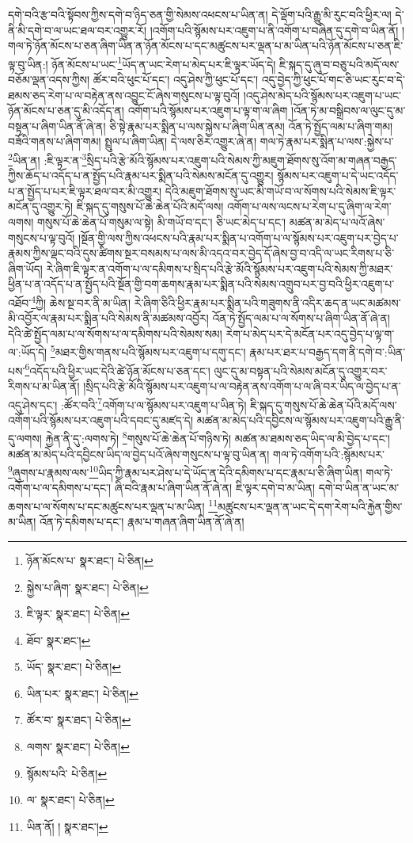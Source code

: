 དགེ་བའི་རྩ་བའི་སྟོབས་ཀྱིས་དགེ་བ་ཉིད་ཅན་གྱི་སེམས་འཕངས་པ་ཡིན་ན། དེ་ལྡོག་པའི་རྒྱུ་མི་རུང་བའི་ཕྱིར་ལ། དེ་ནི་མི་དགེ་བ་ལ་ཡང་ཐལ་བར་འགྱུར་རོ། །འགོག་པའི་སྙོམས་པར་འཇུག་པ་ནི་འགོག་པ་བཞིན་དུ་དགེ་བ་ཡིན་ནོ། །གལ་ཏེ་ཉོན་མོངས་པ་ཅན་ཞིག་ཡིན་ན་ཉོན་མོངས་པ་དང་མཚུངས་པར་ལྡན་པ་མ་ཡིན་པའི་ཉོན་མོངས་པ་ཅན་ཇི་ལྟ་བུ་ཡིན:། ཉོན་མོངས་པ་ཡང་\footnote{ཉོན་མོངས་པ་  སྣར་ཐང་།  པེ་ཅིན། }ཡོད་ན་ཡང་རེག་པ་མེད་པར་ཇི་ལྟར་ཡོད་དེ། ཇི་སྐད་དུ་ཞུ་བ་བཅུ་པའི་མདོ་ལས་བཅོམ་ལྡན་འདས་ཀྱིས། ཚོར་བའི་ཕུང་པོ་དང་། འདུ་ཤེས་ཀྱི་ཕུང་པོ་དང་། འདུ་བྱེད་ཀྱི་ཕུང་པོ་གང་ཅི་ཡང་རུང་བ་དེ་ཐམས་ཅད་རེག་པ་ལ་བརྟེན་ནས་འབྱུང་ངོ་ཞེས་གསུངས་པ་ལྟ་བུའོ། །འདུ་ཤེས་མེད་པའི་སྙོམས་པར་འཇུག་པ་ཡང་ཉོན་མོངས་པ་ཅན་དུ་མི་འདོད་ན། འགོག་པའི་སྙོམས་པར་འཇུག་པ་ལྟ་ག་ལ་ཞིག །འོན་ཏེ་མ་བསྒྲིབས་ལ་ལུང་དུ་མ་བསྟན་པ་ཞིག་ཡིན་ནོ་ཞེ་ན། ཅི་སྟེ་རྣམ་པར་སྨིན་པ་ལས་སྐྱེས་པ་ཞིག་ཡིན་ནམ། འོན་ཏེ་སྤྱོད་ལམ་པ་ཞིག་གམ། བཟོའི་གནས་པ་ཞིག་གམ། སྤྲུལ་པ་ཞིག་ཡིན། དེ་ལས་ཅིར་འགྱུར་ཞེ་ན། གལ་ཏེ་རྣམ་པར་སྨིན་པ་ལས་:སྐྱེས་པ་\footnote{སྐྱེས་པ་ཞིག་  སྣར་ཐང་།  པེ་ཅིན། }ཡིན་ན། :ཇི་ལྟར་ན་\footnote{ཇི་ལྟར་  སྣར་ཐང་།  པེ་ཅིན། }སྲིད་པའི་རྩེ་མོའི་སྙོམས་པར་འཇུག་པའི་སེམས་ཀྱི་མཇུག་ཐོགས་སུ་འོག་མ་གཞན་བརྒྱད་ཀྱིས་ཆོད་པ་འདོད་པ་ན་སྤྱོད་པའི་རྣམ་པར་སྨིན་པའི་སེམས་མངོན་དུ་འགྱུར། སྙོམས་པར་འཇུག་པ་དེ་ཡང་འདོད་པ་ན་སྤྱོད་པ་པར་ཇི་ལྟར་ཐལ་བར་མི་འགྱུར། དེའི་མཇུག་ཐོགས་སུ་ཡང་མི་གཡོ་བ་ལ་སོགས་པའི་སེམས་ཇི་ལྟར་མངོན་དུ་འགྱུར་ཏེ། ཇི་སྐད་དུ་གསུས་པོ་ཆེ་ཆེན་པོའི་མདོ་ལས། འགོག་པ་ལས་ལངས་པ་རེག་པ་དུ་ཞིག་ལ་རེག་ལགས། གསུས་པོ་ཆེ་ཆེན་པོ་གསུམ་ལ་སྟེ། མི་གཡོ་བ་དང་། ཅི་ཡང་མེད་པ་དང་། མཚན་མ་མེད་པ་ལའོ་ཞེས་གསུངས་པ་ལྟ་བུའོ། །སྔོན་གྱི་ལས་ཀྱིས་འཕངས་པའི་རྣམ་པར་སྨིན་པ་འགོག་པ་ལ་སྙོམས་པར་འཇུག་པར་བྱེད་པ་རྣམས་ཀྱིས་ལྡང་བའི་དུས་ཚིགས་སྔར་བསམས་པ་ལས་མི་འདའ་བར་བྱེད་དོ་ཞེས་བྱ་བ་འདི་ལ་ཡང་རིགས་པ་ཅི་ཞིག་ཡོད། རེ་ཞིག་ཇི་ལྟར་ན་འགོག་པ་ལ་དམིགས་པ་སྲིད་པའི་རྩེ་མོའི་སྙོམས་པར་འཇུག་པའི་སེམས་ཀྱི་མཐར་ཕྱིན་པ་ན་འདོད་པ་ན་སྤྱོད་པའི་སྔོན་གྱི་བག་ཆགས་རྣམ་པར་སྨིན་པའི་སེམས་འགྲུབ་པར་བྱ་བའི་ཕྱིར་འཇུག་པ་འཐོབ་\footnote{ཐོབ་  སྣར་ཐང་། }ཀྱི། ཆེས་སྔ་བར་ནི་མ་ཡིན། རེ་ཞིག་ཅིའི་ཕྱིར་རྣམ་པར་སྨིན་པའི་གཟུགས་ནི་འདིར་ཆད་ན་ཡང་མཚམས་མི་འབྱོར་ལ་རྣམ་པར་སྨིན་པའི་སེམས་ནི་མཚམས་འབྱོར། འོན་ཏེ་སྤྱོད་ལམ་པ་ལ་སོགས་པ་ཞིག་ཡིན་ནོ་ཞེ་ན། དེའི་ཚེ་སྤྱོད་ལམ་པ་ལ་སོགས་པ་ལ་དམིགས་པའི་སེམས་སམ། རེག་པ་མེད་པར་དེ་མངོན་པར་འདུ་བྱེད་པ་ལྟ་ག་ལ་:ཡོད་དེ། \footnote{ཡོད་  སྣར་ཐང་།  པེ་ཅིན། }མཐར་གྱིས་གནས་པའི་སྙོམས་པར་འཇུག་པ་དགུ་དང་། རྣམ་པར་ཐར་པ་བརྒྱད་དག་ནི་དགེ་བ་:ཡིན་པས་\footnote{ཡིན་པར་  སྣར་ཐང་།  པེ་ཅིན། }འདོད་པའི་ཕྱིར་ཡང་དེའི་ཚེ་ཉོན་མོངས་པ་ཅན་དང་། ལུང་དུ་མ་བསྟན་པའི་སེམས་མངོན་དུ་འགྱུར་བར་རིགས་པ་མ་ཡིན་ནོ། །སྲིད་པའི་རྩེ་མོའི་སྙོམས་པར་འཇུག་པ་ལ་བརྟེན་ནས་འགོག་པ་ལ་ཞི་བར་ཡིད་ལ་བྱེད་པ་ན་འདུ་ཤེས་དང་། :ཚོར་བའི་\footnote{ཚོར་བ་  སྣར་ཐང་།  པེ་ཅིན། }འགོག་པ་ལ་སྙོམས་པར་འཇུག་པ་ཡིན་ཏེ། ཇི་སྐད་དུ་གསུས་པོ་ཆེ་ཆེན་པོའི་མདོ་ལས་འགོག་པའི་སྙོམས་པར་འཇུག་པའི་དབང་དུ་མཛད་དེ། མཚན་མ་མེད་པའི་དབྱིངས་ལ་སྙོམས་པར་འཇུག་པའི་རྒྱུ་ནི་དུ་ལགས། རྐྱེན་ནི་དུ་:ལགས་ཏེ། \footnote{ལགས་  སྣར་ཐང་།  པེ་ཅིན། }གསུས་པོ་ཆེ་ཆེན་པོ་གཉིས་ཏེ། མཚན་མ་ཐམས་ཅད་ཡིད་ལ་མི་བྱེད་པ་དང་། མཚན་མ་མེད་པའི་དབྱིངས་ཡིད་ལ་བྱེད་པའོ་ཞེས་གསུངས་པ་ལྟ་བུ་ཡིན་ན། གལ་ཏེ་འགོག་པའི་:སྙོམས་པར་\footnote{སྙོམས་པའི་  པེ་ཅིན། }ཞུགས་པ་རྣམས་ལས་\footnote{ལ་  སྣར་ཐང་།  པེ་ཅིན། }ཡིད་ཀྱི་རྣམ་པར་ཤེས་པ་དེ་ཡོད་ན་དེའི་དམིགས་པ་དང་རྣམ་པ་ཅི་ཞིག་ཡིན། གལ་ཏེ་འགོག་པ་ལ་དམིགས་པ་དང་། ཞི་བའི་རྣམ་པ་ཞིག་ཡིན་ནོ་ཞེ་ན། ཇི་ལྟར་དགེ་བ་མ་ཡིན། དགེ་བ་ཡིན་ན་ཡང་མ་ཆགས་པ་ལ་སོགས་པ་དང་མཚུངས་པར་ལྡན་པ་མ་ཡིན། \footnote{ཡིན་ནོ། །   སྣར་ཐང་། }མཚུངས་པར་ལྡན་ན་ཡང་དེ་དག་རེག་པའི་རྐྱེན་གྱིས་མ་ཡིན། འོན་ཏེ་དམིགས་པ་དང་། རྣམ་པ་གཞན་ཞིག་ཡིན་ནོ་ཞེ་ན། 